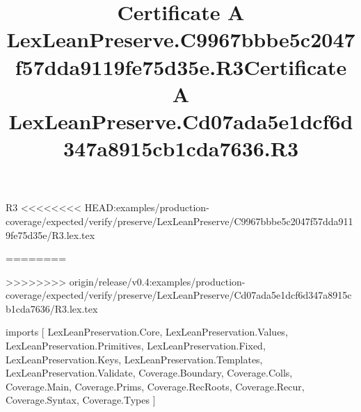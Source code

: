 \begin{lexlean}{R3}
<<<<<<<< HEAD:examples/production-coverage/expected/verify/preserve/LexLeanPreserve/C9967bbbe5c2047f57dda9119fe75d35e/R3.lex.tex
\title{Certificate A LexLeanPreserve.C9967bbbe5c2047f57dda9119fe75d35e.R3}
========
\title{Certificate A LexLeanPreserve.Cd07ada5e1dcf6d347a8915cb1cda7636.R3}
>>>>>>>> origin/release/v0.4:examples/production-coverage/expected/verify/preserve/LexLeanPreserve/Cd07ada5e1dcf6d347a8915cb1cda7636/R3.lex.tex
\begin{coremodule}
imports [
  LexLeanPreservation.Core,
  LexLeanPreservation.Values,
  LexLeanPreservation.Primitives,
  LexLeanPreservation.Fixed,
  LexLeanPreservation.Keys,
  LexLeanPreservation.Templates,
  LexLeanPreservation.Validate,
  Coverage.Boundary,
  Coverage.Colls,
  Coverage.Main,
  Coverage.Prims,
  Coverage.RecRoots,
  Coverage.Recur,
  Coverage.Syntax,
  Coverage.Types
]


\end{coremodule}
\end{lexlean}
